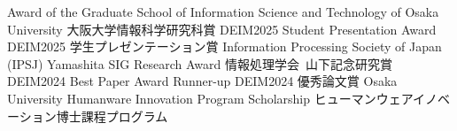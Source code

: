 
{Award of the Graduate School of Information Science and Technology of Osaka University}
{大阪大学情報科学研究科賞}
{DEIM2025 Student Presentation Award}
{DEIM2025 学生プレゼンテーション賞}
{Information Processing Society of Japan (IPSJ) Yamashita SIG Research Award}
{情報処理学会\ 山下記念研究賞}
{DEIM2024 Best Paper Award Runner-up}
{DEIM2024 優秀論文賞}
{Osaka University Humanware Innovation Program Scholarship}
{ヒューマンウェアイノベーション博士課程プログラム}

